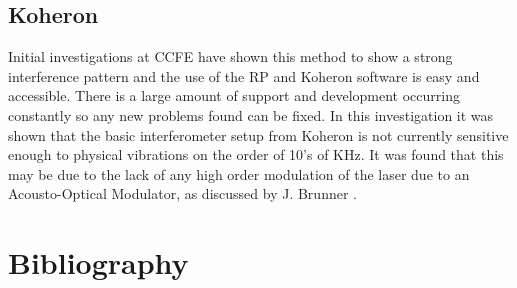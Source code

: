 \documentclass[12pt,a4paper,oneside]{report}
\begin{document}
\section{Koheron}
Initial investigations at CCFE \cite{Hickling2017InvestigationMAST-U} have shown this method to show a strong interference pattern and the use of the RP and Koheron software is easy and accessible. There is a large amount of support and development occurring constantly so any new problems found can be fixed. In this investigation it was shown that the basic interferometer setup from Koheron is not currently sensitive enough to physical vibrations on the order of 10's of KHz. It was found that this may be due to the lack of any high order modulation of the laser due to an Acousto-Optical Modulator, as discussed by J. Brunner \cite[p. ~29]{Brunner2017}.

\pagebreak
\chapter{Bibliography}
	\printbibliography[heading=none]

\pagebreak


\setcounter{page}{2}
\begin{appendices}

%
\end{appendices}
\end{document}
